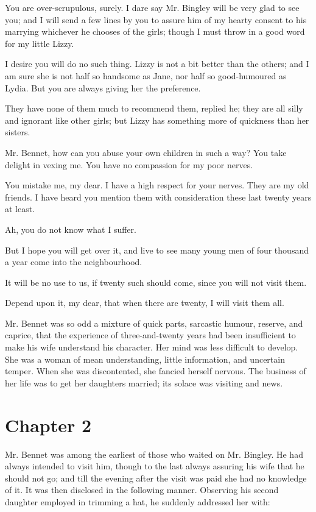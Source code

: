 \documentclass[DIV=6]{scrartcl}
\begin{document}
You are over-scrupulous, surely. I dare say Mr. Bingley will be very
glad to see you; and I will send a few lines by you to assure him of my
hearty consent to his marrying whichever he chooses of the girls; though
I must throw in a good word for my little Lizzy.

I desire you will do no such thing. Lizzy is not a bit better than the
others; and I am sure she is not half so handsome as Jane, nor half so
good-humoured as Lydia. But you are always giving her the preference.

They have none of them much to recommend them, replied he; they are
all silly and ignorant like other girls; but Lizzy has something more of
quickness than her sisters.

Mr. Bennet, how can you abuse your own children in such a way? You
take delight in vexing me. You have no compassion for my poor nerves.

You mistake me, my dear. I have a high respect for your nerves. They
are my old friends. I have heard you mention them with consideration
these last twenty years at least.

Ah, you do not know what I suffer.

But I hope you will get over it, and live to see many young men of four
thousand a year come into the neighbourhood.

It will be no use to us, if twenty such should come, since you will not
visit them.

Depend upon it, my dear, that when there are twenty, I will visit them
all.

Mr. Bennet was so odd a mixture of quick parts, sarcastic humour,
reserve, and caprice, that the experience of three-and-twenty years had
been insufficient to make his wife understand his character. Her mind
was less difficult to develop. She was a woman of mean understanding,
little information, and uncertain temper. When she was discontented,
she fancied herself nervous. The business of her life was to get her
daughters married; its solace was visiting and news.



\section{Chapter 2}


Mr. Bennet was among the earliest of those who waited on Mr. Bingley. He
had always intended to visit him, though to the last always assuring
his wife that he should not go; and till the evening after the visit was
paid she had no knowledge of it. It was then disclosed in the following
manner. Observing his second daughter employed in trimming a hat, he
suddenly addressed her with:
\end{document}
